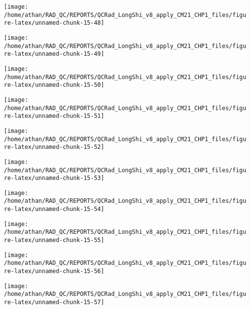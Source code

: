 \documentclass[
  10pt,
  a4paper,oneside]{article}
\begin{document}
\begin{center}\texttt{[image: /home/athan/RAD\_QC/REPORTS/QCRad\_LongShi\_v8\_apply\_CM21\_CHP1\_files/figure-latex/unnamed-chunk-15-48]} \end{center}

\begin{center}\texttt{[image: /home/athan/RAD\_QC/REPORTS/QCRad\_LongShi\_v8\_apply\_CM21\_CHP1\_files/figure-latex/unnamed-chunk-15-49]} \end{center}

\begin{center}\texttt{[image: /home/athan/RAD\_QC/REPORTS/QCRad\_LongShi\_v8\_apply\_CM21\_CHP1\_files/figure-latex/unnamed-chunk-15-50]} \end{center}

\begin{center}\texttt{[image: /home/athan/RAD\_QC/REPORTS/QCRad\_LongShi\_v8\_apply\_CM21\_CHP1\_files/figure-latex/unnamed-chunk-15-51]} \end{center}

\begin{center}\texttt{[image: /home/athan/RAD\_QC/REPORTS/QCRad\_LongShi\_v8\_apply\_CM21\_CHP1\_files/figure-latex/unnamed-chunk-15-52]} \end{center}

\begin{center}\texttt{[image: /home/athan/RAD\_QC/REPORTS/QCRad\_LongShi\_v8\_apply\_CM21\_CHP1\_files/figure-latex/unnamed-chunk-15-53]} \end{center}

\begin{center}\texttt{[image: /home/athan/RAD\_QC/REPORTS/QCRad\_LongShi\_v8\_apply\_CM21\_CHP1\_files/figure-latex/unnamed-chunk-15-54]} \end{center}

\begin{center}\texttt{[image: /home/athan/RAD\_QC/REPORTS/QCRad\_LongShi\_v8\_apply\_CM21\_CHP1\_files/figure-latex/unnamed-chunk-15-55]} \end{center}

\begin{center}\texttt{[image: /home/athan/RAD\_QC/REPORTS/QCRad\_LongShi\_v8\_apply\_CM21\_CHP1\_files/figure-latex/unnamed-chunk-15-56]} \end{center}

\begin{center}\texttt{[image: /home/athan/RAD\_QC/REPORTS/QCRad\_LongShi\_v8\_apply\_CM21\_CHP1\_files/figure-latex/unnamed-chunk-15-57]} \end{center}
\end{document}
